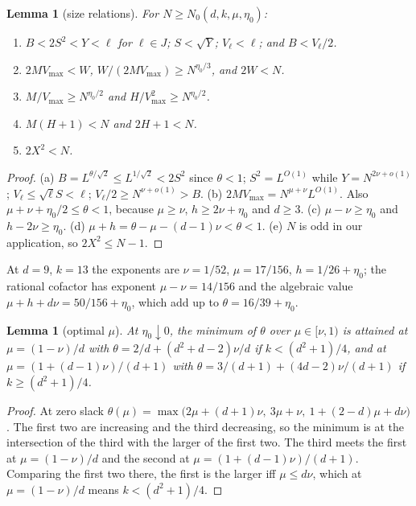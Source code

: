 \documentclass[11pt]{amsart}
\newtheorem{lemma}[theorem]{Lemma}
\theoremstyle{definition}
\newcommand{\VM}{V_{\max}}
\begin{document}
\begin{lemma}[size relations]\label{lem:sizes}
For $N\ge N_0(d,k,\mu,\eta_0)$:
\begin{enumerate}[label=(\alph*)]
\item $B<2S^2<Y<\ell$ for $\ell\in J$; $S<\sqrt Y$; $V_\ell<\ell$; and $B<V_\ell/2$.
\item $2M\VM<W$, $W/(2M\VM)\ge N^{\eta_0/3}$, and $2W<N$.
\item $M/\VM\ge N^{\eta_0/2}$ and $H/\VM^2\ge N^{\eta_0/2}$.
\item $M(H+1)<N$ and $2H+1<N$.
\item $2X^2<N$.
\end{enumerate}
\end{lemma}

\begin{proof}
(a) $B=L^{\theta/\sqrt2}\le L^{1/\sqrt2}<2S^2$ since $\theta<1$; $S^2=L^{O(1)}$ while $Y=N^{2\nu+o(1)}$; $V_\ell\le\sqrt\ell S<\ell$; $V_\ell/2\ge N^{\nu+o(1)}>B$.
(b) $2M\VM=N^{\mu+\nu}L^{O(1)}$. Also $\mu+\nu+\eta_0/2\le\theta<1$, because $\mu\ge\nu$, $h\ge2\nu+\eta_0$ and $d\ge3$.
(c) $\mu-\nu\ge\eta_0$ and $h-2\nu\ge\eta_0$.
(d) $\mu+h=\theta-\mu-(d-1)\nu<\theta<1$.
(e) $N$ is odd in our application, so $2X^2\le N-1$.
\end{proof}

\noindent At $d=9$, $k=13$ the exponents are $\nu=1/52$, $\mu=17/156$, $h=1/26+\eta_0$; the rational
cofactor has exponent $\mu-\nu=14/156$ and the algebraic value $\mu+h+d\nu=50/156+\eta_0$, which add up to $\theta=16/39+\eta_0$.

\begin{lemma}[optimal $\mu$]\label{lem:optmu}
At $\eta_0\downarrow0$, the minimum of $\theta$ over $\mu\in[\nu,1)$ is attained at $\mu=(1-\nu)/d$ with
$\theta=2/d+(d^2+d-2)\nu/d$ if $k<(d^2+1)/4$, and at $\mu=(1+(d-1)\nu)/(d+1)$ with $\theta=3/(d+1)+(4d-2)\nu/(d+1)$
if $k\ge(d^2+1)/4$.
\end{lemma}

\begin{proof}
At zero slack $\theta(\mu)=\max\bigl(2\mu+(d+1)\nu,\ 3\mu+\nu,\ 1+(2-d)\mu+d\nu\bigr)$. The first two
are increasing and the third decreasing, so the minimum is at the intersection of the third with the
larger of the first two. The third meets the first at $\mu=(1-\nu)/d$ and the second at
$\mu=(1+(d-1)\nu)/(d+1)$. Comparing the first two there, the first is the larger iff $\mu\le d\nu$, which
at $\mu=(1-\nu)/d$ means $k<(d^2+1)/4$.
\end{proof}
\end{document}
